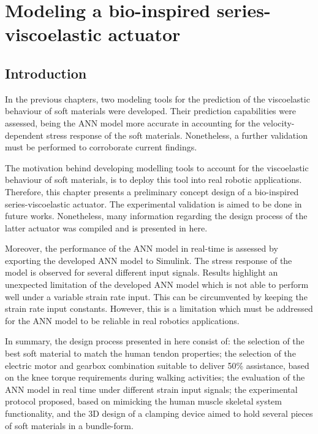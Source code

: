\chapter{Modeling a bio-inspired series-viscoelastic actuator}

\section{Introduction}

In the previous chapters, two modeling tools for the prediction of the viscoelastic behaviour of soft materials were developed. Their prediction capabilities were assessed, being the ANN model more accurate in accounting for the velocity-dependent stress response of the soft materials. Nonetheless, a further validation must be performed to corroborate current findings. 

The motivation behind developing modelling tools to account for the viscoelastic behaviour of soft materials, is to deploy this tool into real robotic applications. Therefore, this chapter presents a preliminary concept design of a bio-inspired series-viscoelastic actuator. The experimental validation is aimed to be done in future works. Nonetheless, many information regarding the design process of the latter actuator was compiled and is presented in here.

Moreover, the performance of the ANN model in real-time is assessed by exporting the developed ANN model to Simulink. The stress response of the model is observed for several different input signals. Results highlight an unexpected limitation of the developed ANN model which is not able to perform well under a variable strain rate input. This can be circumvented by keeping the strain rate input constants. However, this is a limitation which must be addressed for the ANN model to be reliable in real robotics applications.

In summary, the design process presented in here consist of: the selection of the best soft material to match the human tendon properties; the selection of the electric motor and gearbox combination suitable to deliver 50\% assistance, based on the knee torque requirements during walking activities; the evaluation of the ANN model in real time under different strain input signals; the experimental protocol proposed, based on mimicking the human muscle skeletal system functionality, and the 3D design of a clamping device aimed to hold several pieces of soft materials in a bundle-form.


